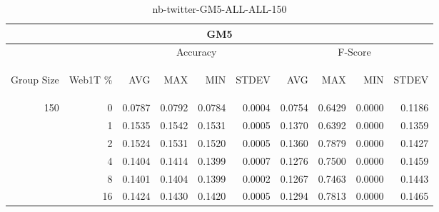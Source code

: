 \begin{center}
\begin{table}[htbp]
\begin{tabular}{ | r | r | r | r | r | r | r | r | r | r |}
\hline
\multicolumn{10}{|c|}{GM5}\\
\hline
 & & \multicolumn{4}{|c|}{Accuracy} & \multicolumn{4}{|c|}{F-Score}\\ \cline{3-10}
\begin{sideways}Group Size\end{sideways} & \begin{sideways}Web1T \%\end{sideways} & \begin{sideways}AVG\end{sideways} & \begin{sideways}MAX\end{sideways} & \begin{sideways}MIN\end{sideways} & \begin{sideways}STDEV\end{sideways} & \begin{sideways}AVG\end{sideways} & \begin{sideways}MAX\end{sideways} & \begin{sideways}MIN\end{sideways} & \begin{sideways}STDEV\end{sideways}\\
\hline
\multirow{5}{*}{150}
 & 0 & 0.0787 & 0.0792 & 0.0784 & 0.0004 & 0.0754 & 0.6429 & 0.0000 & 0.1186\\ \cline{2-10}
 & 1 & 0.1535 & 0.1542 & 0.1531 & 0.0005 & 0.1370 & 0.6392 & 0.0000 & 0.1359\\ \cline{2-10}
 & 2 & 0.1524 & 0.1531 & 0.1520 & 0.0005 & 0.1360 & 0.7879 & 0.0000 & 0.1427\\ \cline{2-10}
 & 4 & 0.1404 & 0.1414 & 0.1399 & 0.0007 & 0.1276 & 0.7500 & 0.0000 & 0.1459\\ \cline{2-10}
 & 8 & 0.1401 & 0.1404 & 0.1399 & 0.0002 & 0.1267 & 0.7463 & 0.0000 & 0.1443\\ \cline{2-10}
 & 16 & 0.1424 & 0.1430 & 0.1420 & 0.0005 & 0.1294 & 0.7813 & 0.0000 & 0.1465\\ \cline{2-10}
\hline
\end{tabular}
\caption{nb-twitter-GM5-ALL-ALL-150}
\label{table:nb-twitter-GM5-ALL-ALL-150}
\end{table}
\end{center}

